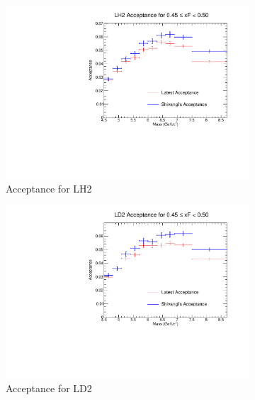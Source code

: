 \documentclass[11pt]{article}
\begin{document}
\begin{figure}[p]
    \centering
    \begin{subfigure}[b]{0.48\textwidth}
       \includegraphics[width=\linewidth]{./acceptancePlots/LH2_acceptance_xF_bin_9.pdf}
       \caption{Acceptance for LH2}
    \end{subfigure}\hfill
    \begin{subfigure}[b]{0.48\textwidth}
       \includegraphics[width=\linewidth]{./acceptancePlots/LD2_acceptance_xF_bin_9.pdf}
       \caption{Acceptance for LD2}
    \end{subfigure}
    \begin{subfigure}[b]{0.48\textwidth}

\end{subfigure}
\end{figure}
\end{document}
